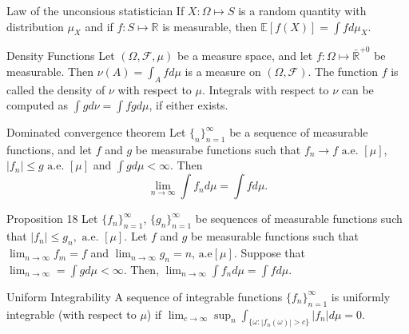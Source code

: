 \documentclass[avery5371,grid]{flashcards}
\begin{document}
\begin{flashcard}[Corollary]{Law of the unconsious statistician}
  If $X : \Omega \mapsto S$ is a random quantity with distribution $\mu_X$ and if 
  $f : S \mapsto \mathbb{R}$ is measurable, then $\mathbb{E} \left[ f\left( X \right) \right] = \int f d\mu_X$.  
\end{flashcard}

\begin{flashcard}[Theorem]{Density Functions}
  Let $\left( \Omega,\mathcal{F},\mu \right)$ be a measure space, and let $f : \Omega \mapsto \bar{\mathbb{R}}^{+0}$
  be measurable. Then $\nu\left( A \right) = \int_A f d\mu$ is a measure on $\left( \Omega,\mathcal{F} \right)$. The function $f$ is
  called the density of $\nu$ with respect to $\mu$. Integrals with respect to
  $\nu$ can be computed as $\int g d\nu = \int f g d\mu$, if either exists. 
\end{flashcard}

\begin{flashcard}[Theorem]{Dominated convergence theorem}
  Let $\{ _n \}_{n=1}^\infty$ be a sequence of measurable functions, and let 
  $f$ and $g$ be measurabe functions such that $f_n \to f \text{ a.e. }[\mu]$,
  $|f_n|\le g \text{ a.e. } [\mu]$ and $\int g d\mu < \infty$. Then
  \[
  \lim_{n \to \infty} \int f_n d\mu = \int f d\mu.
  \]
\end{flashcard}

\begin{flashcard}[Proposition]{Proposition 18}
  Let $\{ f_n \}_{n=1}^\infty$, $\{ g_n \}_{n=1}^\infty$ be sequences of measurable functions
  such that $|f_n| \le g_n, \text{ a.e. } [\mu]$. Let $f$ and $g$ be measurable functions
  such that $\lim_{n \to \infty} f_m =f$ and $\lim_{n \to \infty} g_n = n$,
  $\text{a.e}[\mu]$. Suppose that $\lim_{n \to \infty}=\int g d\mu < \infty$. Then,
  $\lim_{n \to \infty} \int f_n d\mu = \int f d\mu$.
\end{flashcard}

\begin{flashcard}[Definition]{Uniform Integrability}
  A sequence of integrable functions $\{ f_n \}_{n=1}^\infty$ is  uniformly 
  integrable (with respect to  $\mu$) if 
  $\lim_{c \to \infty}\sup_n  \int_{\{ \omega : |f_n\left( \omega \right)| > c\}} |f_n| d\mu = 0$.
\end{flashcard}
\end{document}
